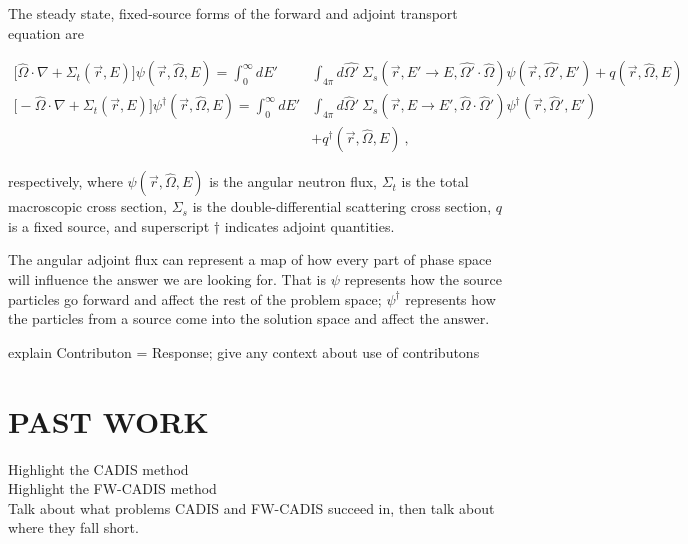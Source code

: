 \documentclass[12pt]{article}
\newcommand{\Macro}{\ensuremath{\Sigma}}
\newcommand{\vOmega}{\ensuremath{\hat{\Omega}}}
\newcommand{\rvec}{\ensuremath{\vec{r}}}
\begin{document}
The steady state, fixed-source forms of the forward and adjoint transport equation are

\begin{align}
\bigl[\hat{\Omega} \cdot \nabla + \Macro_t(\vec{r}, E)\bigr] \psi(\vec{r}, \hat{\Omega}, E)  =  \int_0^{\infty} dE' &\int_{4\pi} d\hat{\Omega'} \:\Macro_{s}(\vec{r}, E' \to E, \hat{\Omega'} \cdot \hat{\Omega}) \psi(\vec{r}, \hat{\Omega'}, E') + q(\vec{r}, \vOmega, E) \label{eq:fwdtransport} \\
%
\bigl[-\vOmega \cdot \nabla + \Sigma_t(\rvec, E)\bigr] \psi^{\dagger}(\vec{r}, \vOmega, E) = \int_0^{\infty} dE' &\int_{4\pi} d\vOmega' \: \Sigma_s(\rvec, E \rightarrow E', \vOmega \cdot \vOmega') \psi^{\dagger}(\rvec, \vOmega', E') \\
&+ q^{\dagger}(\vec{r}, \vOmega, E)  \label{eq:adjtransport} \:, 
\end{align}

respectively, where $\psi(\vec{r}, \hat{\Omega}, E)$ is the angular neutron flux, $\Sigma_t$ is the total macroscopic cross section, $\Sigma_s$ is the double-differential scattering cross section, $q$ is a fixed source, and superscript $\dagger$ indicates adjoint quantities. 

The angular adjoint flux can represent a map of how every part of phase space will influence the answer we are looking for.
That is $\psi$ represents how the source particles go forward and affect the rest of the problem space; $\psi^{\dagger}$ represents how the particles from a source come into the solution space and affect the answer. 

explain Contributon = Response; give any context about use of contributons \\

\section{PAST WORK}
\label{sect::past}
Highlight the CADIS method \\
Highlight the FW-CADIS method \\
Talk about what problems CADIS and FW-CADIS succeed in, then talk about where they fall short. \\
\end{document}
